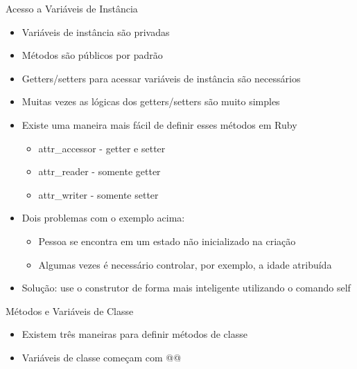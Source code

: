 \begin{frame}{Acesso a Variáveis de Instância}    
  \begin{itemize}
    \item Variáveis de instância são \alert{privadas}
    \item Métodos são públicos por padrão
    \item Getters/setters para acessar variáveis de instância são necessários
  \end{itemize}  
  
  
  \begin{itemize}
    \item Muitas vezes as lógicas dos getters/setters são muito simples
    \item Existe uma maneira mais fácil de definir esses métodos em Ruby
    \begin{itemize}
      \item \alert{attr\_accessor} - getter e setter
      \item \alert{attr\_reader} - somente getter
      \item \alert{attr\_writer} - somente setter
    \end{itemize}
  \end{itemize}  
  

  \begin{itemize}
    \item \alert{Dois problemas} com o exemplo acima:
    \begin{itemize}
      \item Pessoa se encontra em um estado não inicializado na criação
      \item Algumas vezes é necessário controlar, por exemplo, a idade atribuída
    \end{itemize}
    \item \alert{Solução}: use o construtor de forma mais inteligente utilizando o comando \alert{self}
  \end{itemize}  
  
 
\end{frame}

\begin{frame}{Métodos e Variáveis de Classe}    
  \begin{itemize}
    \item \alert{Existem} três maneiras para definir métodos de classe
    \item Variáveis de classe começam com \alert{@@}
  \end{itemize}  
  
 
\end{frame}

